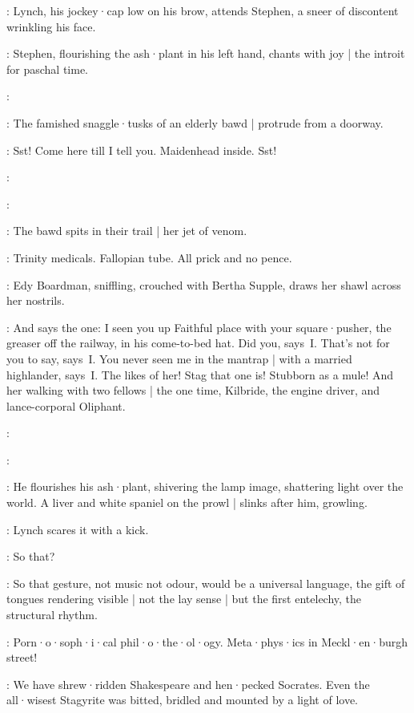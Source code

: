 :
Lynch,
his jockey·cap low on his brow,
attends Stephen,
a sneer of discontent wrinkling his face.

:
Stephen,
flourishing the ash·plant in his left hand,
chants with joy |
the introit for paschal time.

\Stephen:

:
The famished snaggle·tusks of an elderly bawd |
protrude from a doorway.

\Bawd:
Sst!
Come here till I tell you.
Maidenhead inside.
Sst!

:

\Stephen:

:
The bawd spits in their trail |
her jet of venom.

\Bawd:
Trinity medicals.
Fallopian tube.
All prick and no pence.

:
Edy Boardman,
sniffling,
crouched with Bertha Supple,
draws her shawl across her nostrils.

\Edy:
And says the one:
I seen you up Faithful place with your square·pusher,
the greaser off the railway,
in his come-to-bed hat.
Did you,
says~I.
That's not for you to say,
says~I.
You never seen me in the mantrap |
with a married highlander,
says~I.
The likes of her!
Stag that one is!
Stubborn as a mule!
And her walking with two fellows |
the one time,
Kilbride,
the engine driver,
and lance-corporal Oliphant.

:

\Stephen:

:
He flourishes his ash·plant,
shivering the lamp image,
shattering light over the world.
A liver and white spaniel on the prowl |
slinks after him,
growling.

:
Lynch scares it with a kick.

\Lynch:
So that?

\Stephen:
\sout{}
So that gesture,
not music not odour,
would be a universal language,
the gift of tongues rendering visible |
not the lay sense |
but the first entelechy,
the structural rhythm.

\Lynch:
Porn·o·soph·i·cal phil·o·the·ol·ogy.
Meta·phys·ics in Meckl·en·burgh street!

\Stephen:
We have shrew·ridden Shakespeare and hen·pecked Socrates.
Even the all·wisest Stagyrite was bitted,
bridled and mounted by a light of love.

